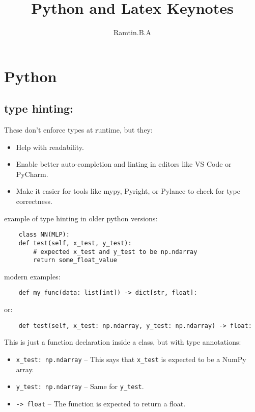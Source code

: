 \documentclass{article}
\title{Python and Latex Keynotes}
\author{Ramtin.B.A}
\begin{document}
\maketitle


\section{Python}
\subsection{type hinting:}

These don’t enforce types at runtime, but they:
\begin{itemize}
\item Help with readability.  
\item Enable better auto-completion and linting in editors like VS Code or PyCharm.
\item Make it easier for tools like mypy, Pyright, or Pylance to check for type correctness.
\end{itemize}

example of type hinting in older python versions:
\begin{lstlisting}
    class NN(MLP):
    def test(self, x_test, y_test):
        # expected x_test and y_test to be np.ndarray
        return some_float_value

\end{lstlisting}
  
modern examples:
\begin{lstlisting}
    def my_func(data: list[int]) -> dict[str, float]:
\end{lstlisting}
or:
\begin{lstlisting}
    def test(self, x_test: np.ndarray, y_test: np.ndarray) -> float:
\end{lstlisting}

This is just a function declaration inside a class, but with type annotations:

\begin{itemize}
    \item \texttt{x\_test: np.ndarray} – This says that \texttt{x\_test} is expected to be a NumPy array.
    \item \texttt{y\_test: np.ndarray} – Same for \texttt{y\_test}.
    \item \texttt{-> float} – The function is expected to return a float.
\end{itemize}
  
\end{document}
